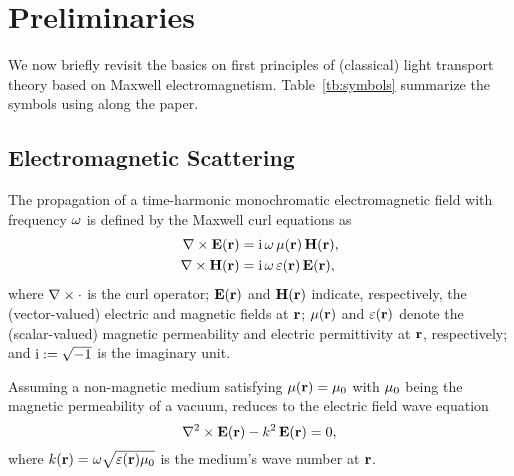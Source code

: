 \section{Preliminaries}
\label{sec:prelim}
%
We now briefly revisit the basics on first principles of (classical) light transport theory based on Maxwell electromagnetism. Table~\ref{tb:symbols} summarize the symbols using along the paper.


\subsection{Electromagnetic Scattering}
\label{ssec:prelim_maxwells}
%
The propagation of a time-harmonic monochromatic electromagnetic field with frequency $\omega$ is defined by the Maxwell curl equations as
\begin{equation}
    \begin{aligned}
        \nabla\times\mathbf{E}(\mathbf{r}) &= \text{i}\,\omega\,\mu(\mathbf{r})\,\mathbf{H}(\mathbf{r}),\\
        \nabla\times\mathbf{H}(\mathbf{r}) &= \text{i}\,\omega\,\varepsilon(\mathbf{r})\,\mathbf{E}(\mathbf{r}),
    \end{aligned}
    \label{eq:maxwell}
\end{equation}
%
where $\nabla\times\cdot$ is the curl operator; $\mathbf{E}(\mathbf{r})$ and $\mathbf{H}(\mathbf{r})$ indicate, respectively, the (vector-valued) electric and magnetic fields at $\mathbf{r}$; $\mu(\mathbf{r})$ and $\varepsilon(\mathbf{r})$ denote the (scalar-valued) magnetic permeability and electric permittivity at $\mathbf{r}$, respectively; and $\text{i} := \sqrt{-1}$ is the imaginary unit.

Assuming a non-magnetic medium satisfying $\mu(\mathbf{r}) = \mu_0$ with $\mu_0$ being the magnetic permeability of a vacuum,  reduces to the electric field wave equation
%
\begin{equation}
    \nabla^2\times\mathbf{E}(\mathbf{r}) - k^2\,\mathbf{E}(\mathbf{r}) = 0,
    \label{eq:efieldwave}
\end{equation}
%
where $k(\mathbf{r}) = \omega\sqrt{\varepsilon(\mathbf{r})\mu_0}$ is the medium's wave number at $\mathbf{r}$. 

